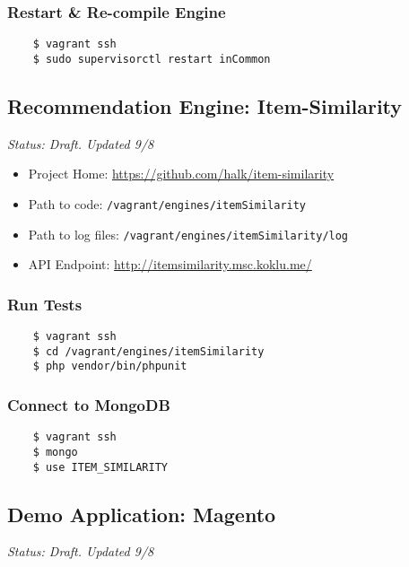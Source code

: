 \subsubsection{Restart \& Re-compile Engine}

\begin{verbatim}
    $ vagrant ssh
    $ sudo supervisorctl restart inCommon
\end{verbatim}


\subsection{Recommendation Engine: Item-Similarity}

\emph{Status: Draft. Updated 9/8}

\begin{itemize}
\item Project Home: \url{https://github.com/halk/item-similarity}
\item Path to code: \texttt{/vagrant/engines/itemSimilarity}
\item Path to log files: \texttt{/vagrant/engines/itemSimilarity/log}
\item API Endpoint: \url{http://itemsimilarity.msc.koklu.me/}
\end{itemize}

\subsubsection{Run Tests}

\begin{verbatim}
    $ vagrant ssh
    $ cd /vagrant/engines/itemSimilarity
    $ php vendor/bin/phpunit
\end{verbatim}

\subsubsection{Connect to MongoDB}

\begin{verbatim}
    $ vagrant ssh
    $ mongo
    $ use ITEM_SIMILARITY
\end{verbatim}



\subsection{Demo Application: Magento}

\emph{Status: Draft. Updated 9/8}

